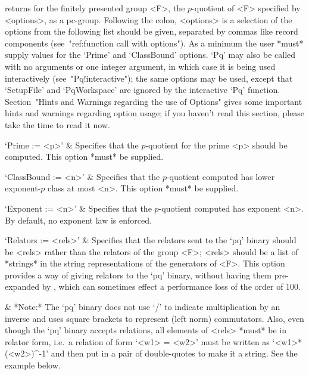 returns for the finitely presented group <F>,  the  $p$-quotient  of  <F>
specified by <options>, as a pc-group. Following the colon, <options>  is
a selection of the options from  the  following  list  should  be  given,
separated by commas like record components (see~"ref:function  call  with
options"). As a minimum the user *must* supply values for the `Prime' and
`ClassBound' options. `Pq' may also be called with no  arguments  or  one
integer  argument,  in  which  case  it  is  being   used   interactively
(see~"Pq!interactive");  the  same  options  may  be  used,  except  that
`SetupFile'  and  `PqWorkspace'  are  ignored  by  the  interactive  `Pq'
function. Section~"Hints and Warnings regarding the use of Options" gives
some important hints and warnings regarding option usage; if you  haven't
read this section, please take the time to read it now.

\beginitems

`Prime := <p>' &
Specifies that the $p$-quotient for the prime  <p>  should  be  computed.
This option *must* be supplied.

`ClassBound := <n>' &
Specifies that the $p$-quotient computed has lower exponent-$p$ class  at
most <n>. This option *must* be supplied.

`Exponent := <n>' &
Specifies that the $p$-quotient computed has exponent <n>. By default, no
exponent law is enforced.

`Relators := <rels>' &
Specifies that the relators sent to the  `pq'  binary  should  be  <rels>
rather than the relators of the group <F>; <rels> should  be  a  list  of
*strings* in the string representations of the generators  of  <F>.  This
option provides a way of giving relators  to  the  `pq'  binary,  without
having  them  pre-expanded  by  {\GAP},  which  can  sometimes  effect  a
performance loss of the order of 100.

&
*Note:*
The `pq' binary does not use `/' to indicate multiplication by an inverse
and uses square brackets to represent (left norm) commutators. Also, even
though the `pq' binary accepts relations, all elements of  <rels>  *must*
be in relator form, i.e.~a relation of form `<w1> = <w2>' must be written
as `<w1>*(<w2>)^-1' and then put in a pair of double-quotes to make it  a
string. See the example below.

